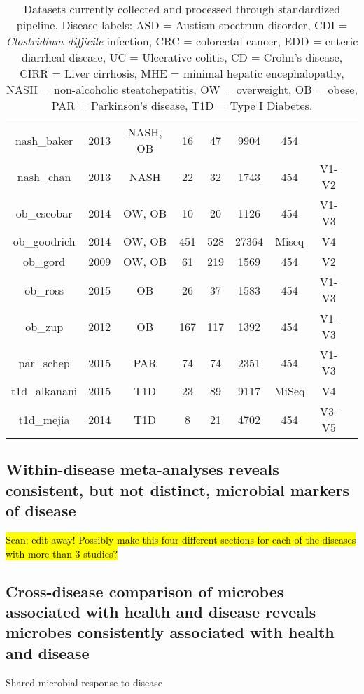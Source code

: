 \documentclass{article}
\begin{document}
{\begin{table}[h]
{\begin{tabular}{|c|c|c|c|c|c|c|c|c|}
	nash\_baker & 2013 & NASH, OB & 16 & 47 & 9904 & 454 &   & \cite{nash-baker}\\ 
	nash\_chan & 2013 & NASH & 22 & 32 & 1743 & 454 & V1-V2 & \cite{nash-chan}\\ 
	ob\_escobar & 2014 & OW, OB & 10 & 20 & 1126 & 454 & V1-V3 & \cite{ob-escobar}\\ 
	ob\_goodrich & 2014 & OW, OB & 451 & 528 & 27364 & Miseq & V4 & \cite{ob-goodrich}\\ 
	ob\_gord & 2009 & OW, OB & 61 & 219 & 1569 & 454 & V2 & \cite{ob-gordon}\\ 
	ob\_ross & 2015 & OB & 26 & 37 & 1583 & 454 & V1-V3 & \cite{ob-ross}\\ 
	ob\_zup & 2012 & OB & 167 & 117 & 1392 & 454 & V1-V3 & \cite{ob-zupancic}\\ 
	par\_schep & 2015 & PAR & 74 & 74 & 2351 & 454 & V1-V3 & \cite{par-schep}\\ 
	t1d\_alkanani & 2015 & T1D & 23 & 89 & 9117 & MiSeq & V4 & \cite{t1d-alkanani}\\ 
	t1d\_mejia & 2014 & T1D & 8 & 21 & 4702 & 454 & V3-V5 & \cite{t1d-mejia}\\ 	
	\hline
\end{tabular}}
\caption{Datasets currently collected and processed through standardized pipeline. Disease labels: ASD = Austism spectrum disorder, CDI = \textit{Clostridium difficile} infection, CRC = colorectal cancer, EDD = enteric diarrheal disease, UC = Ulcerative colitis, CD = Crohn's disease, CIRR = Liver cirrhosis, MHE =  minimal hepatic encephalopathy, NASH = non-alcoholic steatohepatitis, OW = overweight, OB = obese, PAR = Parkinson's disease, T1D = Type I Diabetes. }\label{tab:datasets}
\end{table}
}

\subsection{Within-disease meta-analyses reveals consistent, but not distinct, microbial markers of disease}
\hl{Sean: edit away! Possibly make this four different sections for each of the diseases 
with more than 3 studies?}

\subsection{Cross-disease comparison of microbes associated with health and disease reveals microbes consistently associated with health and disease}
Shared microbial response to disease
\end{document}
